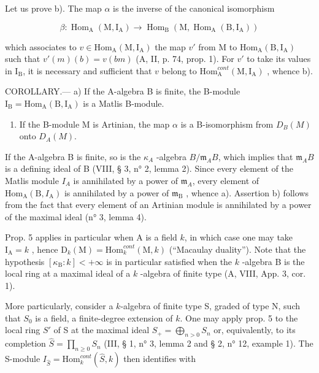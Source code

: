 Let us prove b). The map \(\alpha\) is the inverse of the canonical isomorphism

\[
\beta : \operatorname{Hom} _ {\mathrm{A}} (\mathrm{M}, \mathrm{I} _ {\mathrm{A}}) \longrightarrow \operatorname{Hom} _ {\mathrm{B}} (\mathrm{M}, \operatorname{Hom} _ {\mathrm{A}} (\mathrm{B}, \mathrm{I} _ {\mathrm{A}}))
\]

which associates to \(v \in \mathrm{Hom}_{\mathrm{A}}(\mathrm{M}, \mathrm{I}_{\mathrm{A}})\) the map \(v'\) from M to \(\mathrm{Hom}_{\mathrm{A}}(\mathrm{B}, \mathrm{I}_{\mathrm{A}})\) such that \(v'(m)(b) = v(bm)\) (A, II, p. 74, prop. 1). For \(v'\) to take its values in \(\mathrm{I}_{\mathrm{B}}\), it is necessary and sufficient that \(v\) belong to \(\mathrm{Hom}_{\mathrm{A}}^{cont}(\mathrm{M}, \mathrm{I}_{\mathrm{A}})\) , whence b).

COROLLARY.--- a) If the A-algebra B is finite, the B-module \(\mathrm{I_B} = \mathrm{Hom}_{\mathrm{A}}(\mathrm{B},\mathrm{I}_{\mathrm{A}})\) is a Matlis B-module.

\begin{enumerate}
\def\labelenumi{\alph{enumi})}
\setcounter{enumi}{1}
\tightlist
\item
  If the B-module M is Artinian, the map \(\alpha\) is a B-isomorphism from \(D_{B}(M)\) onto \(D_{A}(M)\).
\end{enumerate}

If the A-algebra B is finite, so is the \(\kappa_{A}\) -algebra \(B/\mathfrak{m}_{A}B\), which implies that \(\mathfrak{m}_{A}B\) is a defining ideal of B (VIII, § 3, n° 2, lemma 2). Since every element of the Matlis module \(I_{A}\) is annihilated by a power of \(\mathfrak{m}_{A}\), every element of \(\mathrm{Hom}_{\mathrm{A}}(\mathrm{B}, I_{\mathrm{A}})\) is annihilated by a power of \(\mathfrak{m}_{\mathrm{B}}\) , whence a). Assertion b) follows from the fact that every element of an Artinian module is annihilated by a power of the maximal ideal (n° 3, lemma 4).

Prop. 5 applies in particular when A is a field \(k\), in which case one may take \(\mathrm{I}_{\mathrm{A}} = k\) , hence \(\mathrm{D}_{k}(\mathrm{M}) = \mathrm{Hom}_{k}^{cont}(\mathrm{M}, k)\) (“Macaulay duality”). Note that the hypothesis \([\kappa_{\mathrm{B}} : k] < +\infty\) is in particular satisfied when the \(k\) -algebra B is the local ring at a maximal ideal of a \(k\) -algebra of finite type (A, VIII, App. 3, cor. 1).

More particularly, consider a \(k\)-algebra of finite type S, graded of type N, such that \(S_0\) is a field, a finite-degree extension of \(k\). One may apply prop. 5 to the local ring \(S'\) of S at the maximal ideal \(S_+ = \bigoplus_{n > 0} S_n\) or, equivalently, to its completion \(\widehat{S} = \prod_{n \geqslant 0} S_n\) (III, § 1, n° 3, lemma 2 and § 2, n° 12, example 1). The S-module \(I_{\widehat{S}} = \text{Hom}_k^{cont}(\widehat{S}, k)\) then identifies with

